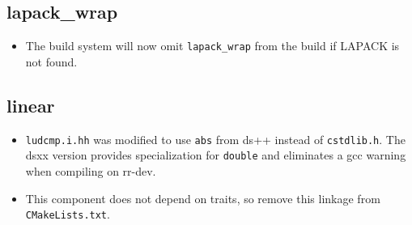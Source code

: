 \documentclass[note]{ResearchNote_pdf}
\newcommand{\draco}{Draco}
\newcommand{\scons}{\textsf{SCons}}
\begin{document}

\subsection{lapack\_wrap}
\label{changes:lapackwrap}
\begin{itemize}
\item The build system will now omit \texttt{lapack\_wrap} from the build
  if \textsf{LAPACK} is not found.
\end{itemize}

\subsection{linear}
\label{changes:linear}
\begin{itemize}
\item \texttt{ludcmp.i.hh} was modified to use \texttt{abs} from
  \textsf{ds++} instead of \texttt{cstdlib.h}. The dsxx version
  provides specialization for \texttt{double} and eliminates a gcc
  warning when compiling on rr-dev.
\item This component does not depend on \textsf{traits}, so remove this
  linkage from \texttt{CMakeLists.txt}.
\end{itemize}

\end{document}
